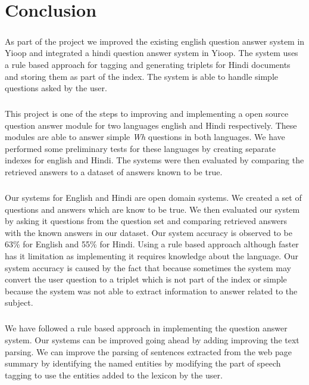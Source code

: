 \chapter{Conclusion}

\paragraph{}
As part of the project we improved the existing english question answer system in Yioop and integrated a hindi question answer system in Yioop. The system uses a rule based approach for tagging and generating triplets for Hindi documents and storing them as part of the index. The system is able to handle simple questions asked by the user.

\paragraph{}
This project is one of the steps to improving and implementing a open source question answer module for two languages english and Hindi respectively. These modules are able to answer simple \textit{Wh} questions in both languages. We have performed some preliminary tests for these languages by creating separate indexes for english and Hindi. The systems were then evaluated by comparing the retrieved answers to a dataset of answers known to be true.

\paragraph{}
Our systems for English and Hindi are open domain systems. We created a set of questions and answers which are know to be true. We then evaluated our system by asking it questions from the question set and comparing retrieved answers with the known answers in our dataset. Our system accuracy is observed to be 63\% for English and 55\% for Hindi. Using a rule based approach although faster has it limitation as implementing it requires knowledge about the language. Our system accuracy is caused by the fact that because sometimes the system may convert the user question to a triplet which is not part of the index or simple because the system was not able to extract information to answer related to the subject.

\paragraph{}
We have followed a rule based approach in implementing the question answer system. Our systems can be improved going ahead by adding improving the text parsing. We can improve the parsing of sentences extracted from the web page summary by identifying the named entities by modifying the part of speech tagging to use the entities added to the lexicon by the user.